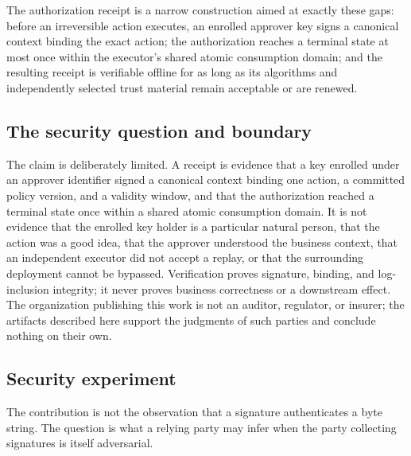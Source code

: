 \documentclass[11pt]{article}
\begin{document}
The authorization receipt is a narrow construction aimed at exactly these gaps:
before an irreversible action executes, an enrolled approver key signs a canonical
context binding the exact action; the authorization reaches a terminal state at
most once within the executor's shared atomic consumption domain; and the
resulting receipt is verifiable offline for as long as its algorithms and
independently selected trust material remain acceptable or are renewed.

\subsection{The security question and boundary}

The claim is deliberately limited. A receipt is evidence that a key enrolled
under an approver identifier signed a canonical context binding one action, a
committed policy version, and a validity window, and that the authorization
reached a terminal state once within a shared atomic consumption domain. It is not
evidence that the enrolled key holder is a particular natural person, that the
action was a good idea, that the approver understood the business context, that an
independent executor did not accept a replay, or that the surrounding deployment
cannot be bypassed. Verification proves signature, binding, and log-inclusion
integrity; it never proves business correctness or a downstream effect. The
organization publishing this work is not an auditor, regulator, or insurer; the
artifacts described here support the judgments of such parties and conclude
nothing on their own.

\subsection{Security experiment}

The contribution is not the observation that a signature authenticates a byte
string. The question is what a relying party may infer when the party collecting
signatures is itself adversarial.
\end{document}
